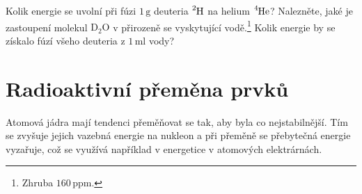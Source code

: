 \documentclass[a4paper,12pt,oneside]{article}
\def\unit#1{\,\mathrm{#1}}
\theoremstyle{red}
\begin{document}
    \begin{task}
        Kolik energie se uvolní při fúzi $1\unit{g}$ deuteria $\ce{^{2}H}$ na helium $\ce{^{4}He}$?
        Nalezněte, jaké je zastoupení molekul $\mathrm{D_{2}O}$ v přirozeně se vyskytující vodě.\footnote{
            Zhruba $160\unit{ppm}$.
        }
        Kolik energie by se získalo fúzí všeho deuteria z $1\unit{ml}$ vody?
    \end{task}

\section{Radioaktivní přeměna prvků}
    Atomová jádra mají tendenci přeměňovat se tak, aby byla co nejstabilnější. Tím se zvyšuje jejich vazebná energie na nukleon a při přeměně se přebytečná energie vyzařuje, což se využívá například v energetice v atomových elektrárnách.
\end{document}
